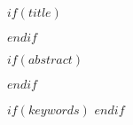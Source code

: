 $if(title)$
\maketitle
$endif$

$if(abstract)$
\begin{abstract}
$abstract$
\end{abstract}
$endif$

$if(keywords)$
$endif$